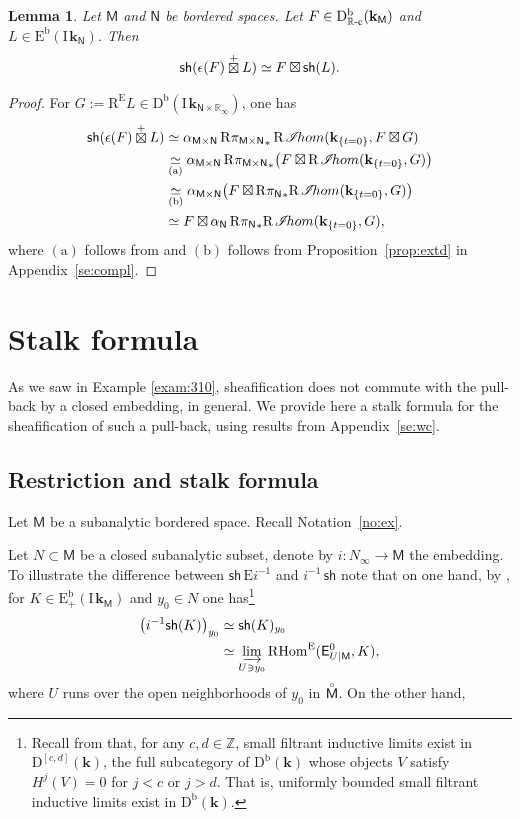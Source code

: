 \documentclass[JEP,XML,SOM,Unicode]{cedram}
\let\mathcal\mathscr
\newcommand{\bl}{\bigl(}
\newcommand{\br}{\bigr)}
\theoremstyle{plain}
\newtheorem{lemma}[theorem]{Lemma}
\theoremstyle{definition}
\newcommand{\R}{\mathbb{R}}
\newcommand{\Z}{\mathbb{Z}}
\newcommand{\bR}{{\R_\infty}}
\newcommand{\derived}[1]{\mathrm{#1}}
\newcommand{\derd}{\derived{D}}
\newcommand{\dere}{\derived{E}}\let\enh\dere
\newcommand{\derr}{\derived{R}}
\newcommand{\BDC}{\derd^{\mathrm{b}}}
\newcommand{\BEC}[2][\ifield]{\dere^{\mathrm{b}}(#1_{#2})}
\newcommand{\BECp}[2][\ifield]{\dere^{\mathrm{b}}_+(#1_{#2})}
\newcommand{\RHom}[1][]{\derr\mathrm{Hom}_{\raise1.5ex\hbox to.1em{}#1}}
\newcommand{\roim}[1]{\derr#1_*}
\newcommand{\FHom}{\RHom^\enh}
\newcommand{\rihom}{{\derr\mspace{2mu}\shi\!hom}}
\newcommand{\etens}[1][]{\mathbin{\boxtimes_{\raise1.5ex\hbox to-.1em{}#1}}}
\newcommand{\sheaffont}[1]{\mathcal{#1}}
\newcommand\shi{\sheaffont{I}}
\newcommand{\RE}{\operatorname{R^\enh}}
\newcommand{\Eopb}[1]{\enh#1^{-1}}
\newcommand{\Rc}{{\R\text-\mathrm{c}}}
\newcommand{\field}{\mathbf{k}}\let\cor\field
\newcommand{\ind}{\mathrm{I}\mspace{2mu}}
\newcommand{\ifield}{\ind\field}
\newcommand{\unbordered}[1]{{\accentset{\circ}{#1}}}
\newcommand{\inbordered}[1]{{#1_\infty}}
\newcommand{\cetens}{\mathbin{\mathop\boxtimes\limits^+}}
\newcommand{\ex}{\mathsf{E}}\let\exx\ex
\newcommand{\sh}{\mathsf{sh}}
\newcommand{\bbM}{\mathsf{M}}
\newcommand{\obM}{\unbordered{\bbM}}
\newcommand{\bbN}{\mathsf{N}}
\newcommand{\bN}{\inbordered{N}}
\newcommand{\defeq}{\mathbin{:=}}\let \seteq\defeq
\newcommand{\ilim}[1][]{\mathop{\varinjlim}\limits_{#1}}
\newcommand{\st}[1]{{\{{#1}\}}}
\newcommand{\opb}[1]{#1^{-1}}
\begin{document}
\begin{lemma}\label{lem:shetens}
Let $\bbM$ and $\bbN$ be bordered spaces.
Let $F\in\BDC_\Rc(\field_\bbM)$ and $L\in\BEC\bbN$. Then
\[
\sh(\epsilon(F)\cetens L) \simeq F \etens \sh(L).
\]
\end{lemma}

\begin{proof}
For $G\defeq\RE L\in\BDC(\ifield_{\bbN\times\bR})$, one has
\begin{align*}
\sh(\epsilon(F)\cetens L)
&\simeq \alpha_{\bbM\times\bbN}\,\roim{{\pi_{\bbM\times\bbN}}}\,\rihom(\field_{\st{t= 0}}, F\etens G) \\
&\underset{(\text{a})}\simeq \alpha_{\bbM\times\bbN}\,\roim{{\pi_{\bbM\times\bbN}}}
\bl F\etens\rihom(\field_{\st{t= 0}}, G)\br \\
&\underset{(\text{b})}\simeq \alpha_{\bbM\times\bbN}\bl F\etens
\roim{{\pi_{\bbN}}}\rihom(\field_{\st{t= 0}}, G)\br \\
&\simeq F\etens\alpha_\bbN\,\roim{{\pi_\bbN}}\rihom(\field_{\st{t= 0}}, G) ,
\end{align*}
where $(\text{a})$ follows from \cite[Cor.\,2.3.5]{DK16}
and $(\text{b})$ follows from Proposition~\ref{prop:extd} in Appendix~\ref{se:compl}.
\end{proof}

\section{Stalk formula}\label{se:germ}

As we saw in Example \ref{exam:310}, sheafification does not commute with the pull-back by a closed embedding, in general. We provide here a stalk formula for the sheafification of such a pull-back, using results from Appendix~\ref{se:wc}.

\subsection{Restriction and stalk formula}

Let $\bbM$ be a subanalytic bordered space.
Recall Notation~\ref{no:ex}.

Let $N\subset\bbM$ be a closed subanalytic subset, denote by $i\colon \bN\to \bbM$ the embedding.
To illustrate the difference between $\sh\,\Eopb i$ and $\opb i \, \sh$ note that on one hand, by \hbox{\cite[Lem.\,2.4.1]{DK18}}, for $K\in\BECp \bbM$ and $y_0\in N$ one has\footnote{Recall from \cite[\S2.1]{DK18} that, for any $c,d\in\Z$, small filtrant inductive limits exist in $\derd^{[c,d]}(\field)$, the full subcategory of $\BDC(\field)$ whose objects $V$ satisfy $H^j(V)=0$ for $j<c$ or $j>d$. That is, uniformly bounded small filtrant inductive limits exist in $\BDC(\field)$.}
\begin{align*}
\bl \opb i \sh(K)\br_{y_0} &\simeq
\sh(K)_{y_0} \\ &\simeq
\ilim[U\owns y_0]\FHom(\ex^0_{U|\bbM},K),
\end{align*}
where $U$ runs over the open neighborhoods of $y_0$ in $\obM$.
On the other hand,
\end{document}
